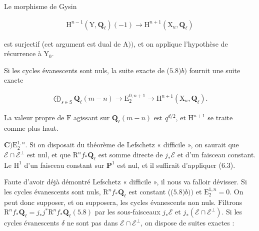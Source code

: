 \documentclass[10pt,leqno]{article}
\begin{document}
\clearpage

\begingroup\setlength{\parskip}{.20em}\setlength{\abovedisplayskip}{4pt}\setlength{\belowdisplayskip}{4pt}\setlength{\abovedisplayshortskip}{2pt}\setlength{\belowdisplayshortskip}{2pt}

\label{physical-29}\par\smallskip

\noindent Le morphisme de Gysin\par

\begin{equation*}\begin{gathered}\mathrm{H}^{n- 1}(\mathrm{Y},\mathbf{Q}_{\ell })(- 1) \longrightarrow  \mathrm{H}^{n+1}(\mathrm{X}_{u},\mathbf{Q}_{\ell })\end{gathered}\end{equation*}

\noindent est surjectif (cet argument est dual de \(\mathrm{A}))\), et on applique l’hypothèse de récurrence à \(\mathrm{Y}_{0}\).\par

\noindent Si les cycles évanescents sont nuls, la suite exacte de (\(5.8) b)\) fournit une suite exacte\par

\begin{equation*}\begin{gathered}\bigoplus\limits_{s\in \mathrm{S}}\mathbf{Q}_{\ell }(m- n) \longrightarrow  \mathrm{E}_{2}^{0,n+1} \longrightarrow  \mathrm{H}^{n+1}(\mathrm{X}_{u},\mathbf{Q}_{\ell }).\end{gathered}\end{equation*}

\noindent La valeur propre de \(\mathrm{F}\) agissant sur \(\mathbf{Q}_{\ell }(m- n)\) est \(q^{d/2}\), et \(\mathrm{H}^{n+1}\) se traite comme plus haut.\par

\noindent \(\mathbf{C}) \mathrm{E}_{2}^{1,n}\). Si on disposait du théorème de Lefschetz « difficile », on saurait que \(\mathcal{E} \cap \mathcal{E} ^{\perp }\) est nul, et que \(\mathrm{R}^{n} f_{*}\mathbf{Q}_{\ell }\) est somme directe de \(j_{*}\mathcal{E} \) et d’un faisceau constant. Le \(\mathrm{H}^{1}\) d’un faisceau constant sur \(\mathbf{P}^{1}\) est nul, et il suffirait d’appliquer (6.3).\par

\noindent Faute d’avoir déjà démontré Lefschetz « difficile », il nous va falloir dévisser. Si les cycles évanescents sont nuls, \(\mathrm{R}^{n} f_{*}\mathbf{Q}_{\ell }\) est constant ((\(5.8) b))\) et \(\mathrm{E}_{2}^{1,n}=0\). On peut donc supposer, et on supposera, les cycles évanescents non nuls. Filtrons \(\mathrm{R}^{n} f_{*}\mathbf{Q}_{\ell }=j_{*}j^{*}\mathrm{R}^{n} f_{*}\mathbf{Q}_{\ell } (5.8)\) par les sous-faisceaux \(j_{*}\mathcal{E} \) et \(j_{*}(\mathcal{E} \cap \mathcal{E} ^{\perp })\). Si les cycles évanescents \(\delta \) ne sont pas dans \(\mathcal{E} \cap \mathcal{E} ^{\perp }\), on dispose de suites exactes :\par
\end{document}
